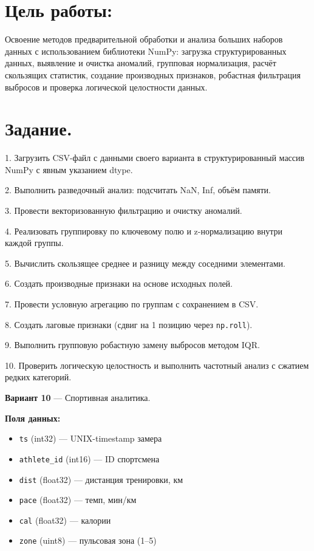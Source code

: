 \documentclass[oneside,a4paper,14pt]{extarticle}
\begin{document}
\begin{flushleft}
\section*{Цель работы:}
\noindent Освоение методов предварительной обработки и анализа больших наборов данных с использованием библиотеки NumPy: загрузка структурированных данных, выявление и очистка аномалий, групповая нормализация, расчёт скользящих статистик, создание производных признаков, робастная фильтрация выбросов и проверка логической целостности данных.

\section*{Задание.}

1. Загрузить CSV-файл с данными своего варианта в структурированный массив NumPy с явным указанием dtype.

2. Выполнить разведочный анализ: подсчитать NaN, Inf, объём памяти.

3. Провести векторизованную фильтрацию и очистку аномалий.

4. Реализовать группировку по ключевому полю и z-нормализацию внутри каждой группы.

5. Вычислить скользящее среднее и разницу между соседними элементами.

6. Создать производные признаки на основе исходных полей.

7. Провести условную агрегацию по группам с сохранением в CSV.

8. Создать лаговые признаки (сдвиг на 1 позицию через \texttt{np.roll}).

9. Выполнить групповую робастную замену выбросов методом IQR.

10. Проверить логическую целостность и выполнить частотный анализ с сжатием редких категорий.

\textbf{Вариант 10} --- Спортивная аналитика.

\textbf{Поля данных:}
\begin{itemize}
\item \texttt{ts} (int32) --- UNIX-timestamp замера
\item \texttt{athlete\_id} (int16) --- ID спортсмена
\item \texttt{dist} (float32) --- дистанция тренировки, км
\item \texttt{pace} (float32) --- темп, мин/км
\item \texttt{cal} (float32) --- калории
\item \texttt{zone} (uint8) --- пульсовая зона (1--5)
\end{itemize}


\end{flushleft}
\end{document}
